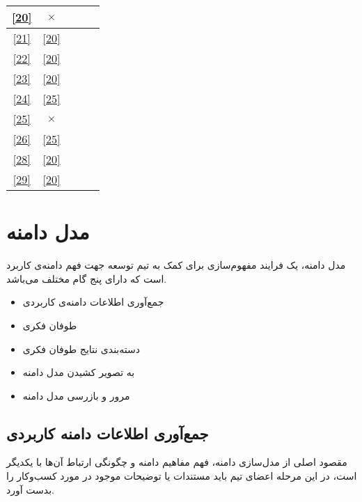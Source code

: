 \documentclass[12pt,svgnames,oneside]{book}
\begin{document}
\begin{center}
\begin{longtable}{|c|c|c|c|c|}
						\ref{20} & $\times$ & \checkmark & & \\ \hline
						\ref{21} & \ref{20} & \checkmark & & \\ \hline
						\ref{22} & \ref{20} & \checkmark & & \\ \hline
						\ref{23} & \ref{20} & \checkmark & & \\ \hline
						\ref{24} & \ref{25} & \checkmark & & \\ \hline
						\ref{25} & $\times$ & \checkmark & & \\ \hline
						\ref{26} & \ref{25} & \checkmark & & \\ \hline
						\ref{28} & \ref{20} & \checkmark & & \\ \hline
						\ref{29} & \ref{20} & \checkmark & & \\ \hline
					\end{longtable}
				\end{center}
	
	\chapter{مدل دامنه}
		مدل دامنه، یک فرایند مفهوم‌سازی برای کمک به تیم توسعه جهت فهم دامنه‌ی کاربرد است که دارای پنج گام مختلف می‌باشد.
		\begin{itemize}
			\item جمع‌آوری اطلاعات دامنه‌‌ی کاربردی 
			\item طوفان فکری
			\item دسته‌بندی نتایج طوفان فکری
			\item به تصویر کشیدن مدل دامنه
			\item مرور و بازرسی مدل دامنه
		\end{itemize}
	
		\section{جمع‌آوری اطلاعات دامنه کاربردی}	
			مقصود اصلی از مدل‌سازی دامنه، فهم مفاهیم دامنه و چگونگی ارتباط آن‌ها با یکدیگر است، در این مرحله اعضای تیم باید مستندات یا توضیحات موجود در مورد کسب‌و‌کار را بدست آورد.
\end{document}
